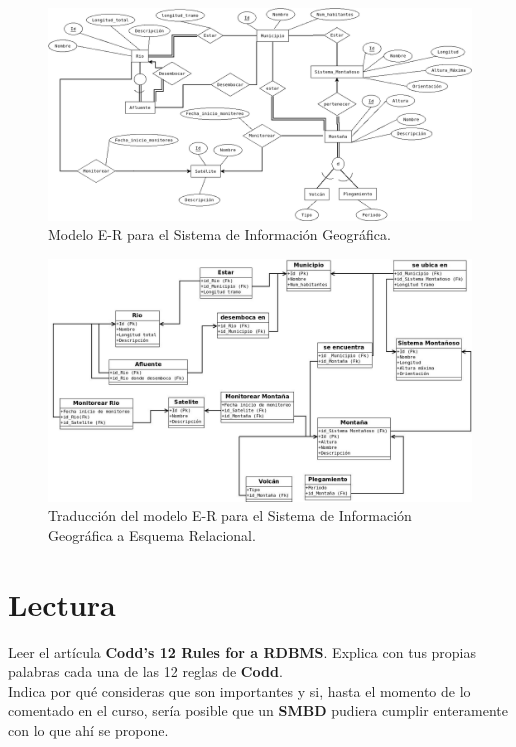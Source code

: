 \documentclass{article}
\begin{document}
    \begin{figure}[H]
    	\begin{center}
    		\includegraphics[width=1\textwidth]{2b.png}
    	\end{center}
    	\caption{Modelo E-R para el Sistema de Información Geográfica.}
    \end{figure}
    
    \begin{figure}[H]
      \begin{center}
      	\includegraphics[width=1\textwidth]{esquemaRelacionalGeo.jpeg}
      \end{center}
      \caption{Traducción del modelo E-R para el Sistema de Información Geográfica
       a  Esquema Relacional.}
   \end{figure}

    \section{Lectura}
    Leer el artícula \textbf{Codd's 12 Rules for a RDBMS}. Explica con tus 
    propias palabras cada una de las 12 reglas de \textbf{Codd}.\\
    Indica por qué consideras que son importantes y si, hasta el momento de lo 
    comentado en el curso, sería posible que un \textbf{SMBD} pudiera cumplir 
    enteramente con lo que ahí se propone.
    
\end{document}
